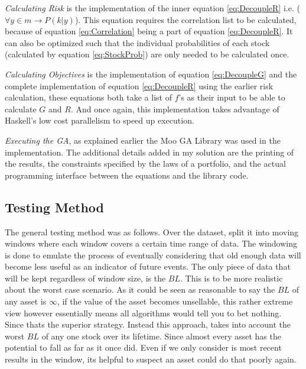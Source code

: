 \documentclass[11pt]{article}
\begin{document}
    \textit{Calculating Risk} is the implementation of the inner equation \ref{eq:DecoupleR} 
    i.e. (\(\forall y \in m \to P(k|y)\)). This equation
    requires the correlation list to be calculated, because of equation \ref{eq:Correlation} being a
    part of equation \ref{eq:DecoupleR}. It can also be optimized such that the individual
    probabilities of each stock (calculated by equation \ref{eq:StockProb}) are only needed to be
    calculated once.

    \textit{Calculating Objectives} is the implementation of equation \ref{eq:DecoupleG} and the complete
    implementation of equation \ref{eq:DecoupleR} using the earlier risk calculation, these
    equations both take a list of \(f\)'s as their input to be able to calculate \(G\) and \(R\).
    And once again, this implementation takes advantage of Haskell's low cost parallelism to speed
    up execution.

    \textit{Executing the GA}, as explained earlier the Moo GA Library \cite{Moo} was used in
    the implementation. The additional details added in my solution are the printing of the results,
    the constraints specified by the laws of a portfolio, and the actual programming interface
    between the equations and the library code.

\subsection{Testing Method}

    The general testing method was as follows. Over the dataset, split it into moving windows
    where each window covers a certain time range of data. The windowing is done to emulate
    the process of eventually considering that old enough data will become less useful
    as an indicator of future events. The only piece of data that will be kept regardless
    of window size, is the \(BL\). This is to be more realistic about the worst case scenario.
    As it could be seen as reasonable to say the \(BL\) of any asset is \(\infty\), if the value
    of the asset becomes unsellable, this rather extreme view however essentially means all
    algorithms would tell you to bet nothing. Since thats the superior strategy. Instead
    this approach, takes into account the worst \(BL\) of any one stock over its lifetime.
    Since almost every asset has the potential to fall as far as it once did. Even if we only
    consider is most recent results in the window, its helpful to suspect an asset could
    do that poorly again.
\end{document}
